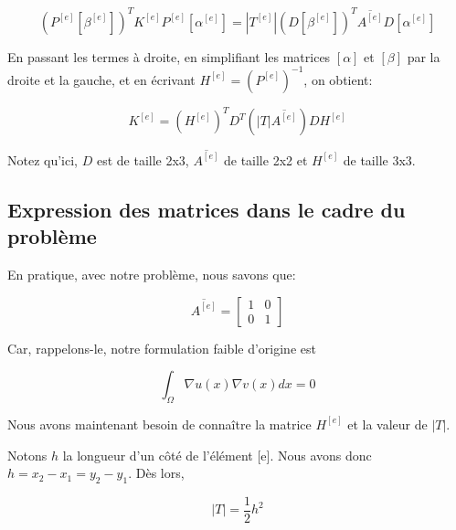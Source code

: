 \documentclass{article}
\begin{document}
\vspace{-0.6cm}

\begin{equation}
    \left(P^{[e]}\left[\beta^{[e]}\right] \right)^T K^{[e]}
    P^{[e]}\left[\alpha^{[e]}\right] = |T^{[e]}|
    \left(D\left[\beta^{[e]}\right]\right)^T
    \overline{A^{[e]}} D\left[\alpha^{[e]}\right]
\end{equation}

\vspace{0.4cm}

En passant les termes à droite, en simplifiant les
matrices $\left[\alpha\right]$ et $\left[\beta\right]$ par
la droite et la gauche, et en écrivant
$H^{[e]} = \left( P^{[e]}\right)^{-1}$, on obtient:

\begin{equation}
    K^{[e]} = \left(H^{[e]}\right)^T D^T
    \left( |T| \overline{A^{[e]}} \right) D H^{[e]}
\end{equation}

Notez qu'ici, $D$ est de taille 2x3, $\overline{A^{[e]}}$
de taille 2x2 et $H^{[e]}$ de taille 3x3.

\subsection{Expression des matrices dans le cadre du problème}
\label{sec:cadre_du_pb}

En pratique, avec notre problème, nous savons que:

\begin{equation}
    \overline{A^{[e]}} =
    \begin{bmatrix}
        1 & 0 \\ 0 & 1
    \end{bmatrix}
\end{equation}

Car, rappelons-le, notre formulation faible d'origine est

\begin{equation}
    \int_\Omega \nabla u(x) \nabla v(x) dx = 0
\end{equation}

Nous avons maintenant besoin de connaître la matrice $H^{[e]}$
et la valeur de $|T|$.

Notons $h$ la longueur d'un côté de l'élément [e]. Nous avons donc
$h = x_2 - x_1 = y_2 - y_1$. Dès lors,

\begin{equation}
    |T| = \frac{1}{2} h^2
\end{equation}
\end{document}
